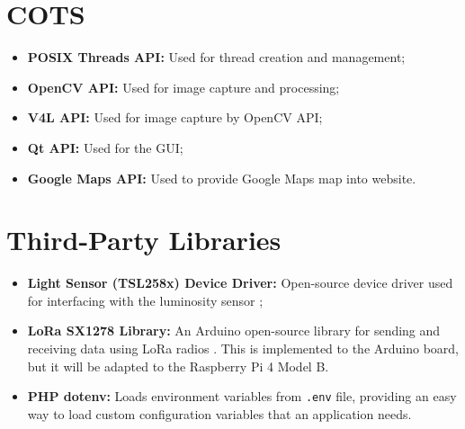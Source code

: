 \section{COTS}

\begin{itemize}
	\item \textbf{POSIX Threads API:} Used for thread creation and management;
	\item \textbf{OpenCV API:} Used for image capture and processing;
	\item \textbf{V4L API:} Used for image capture by OpenCV API;
	\item \textbf{Qt API:} Used for the GUI;
	\item \textbf{Google Maps API:} Used to provide Google Maps map into website.
\end{itemize}

\section{Third-Party Libraries}

\begin{itemize}
	\item \textbf{Light Sensor (TSL258x) Device Driver:} Open-source device driver used for interfacing with the luminosity sensor \cite{code_tsl};
	\item \textbf{LoRa SX1278 Library:} An Arduino open-source library for sending and receiving data using LoRa radios \cite{sx1278_lib}. This is implemented to the Arduino board, but it will be adapted to the Raspberry Pi 4 Model B.
	\item \textbf{PHP dotenv:} Loads environment variables from \verb|.env| file, providing an easy way to load custom configuration variables that an application needs. \cite{phpdotenv}
\end{itemize}
